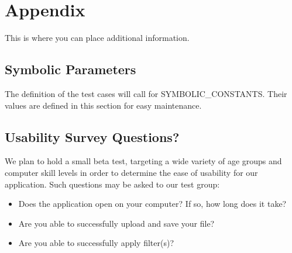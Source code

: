 \documentclass[12pt, titlepage]{article}
\begin{document}




\newpage

\section{Appendix}

This is where you can place additional information.

\subsection{Symbolic Parameters}

The definition of the test cases will call for SYMBOLIC\_CONSTANTS.
Their values are defined in this section for easy maintenance.

\subsection{Usability Survey Questions?}

We plan to hold a small beta test, targeting a wide variety of age groups and computer skill levels in order to determine the ease of usability for our application.  Such questions may be asked to our test group:

\begin{itemize}
	\item Does the application open on your computer? If so, how long does it take?
	\item Are you able to successfully upload and save your file?
	\item Are you able to successfully apply filter(s)?
\end{itemize}
\end{document}
